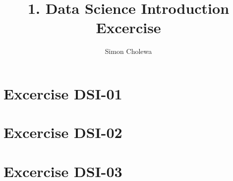 \documentclass[]{article}
\title{}
\author{}
\begin{document}
\author{Simon Cholewa}
\title{1. Data Science Introduction Excercise}

\maketitle

\section{Excercise DSI-01}


\section{Excercise DSI-02}


\section{Excercise DSI-03}
\end{document}
